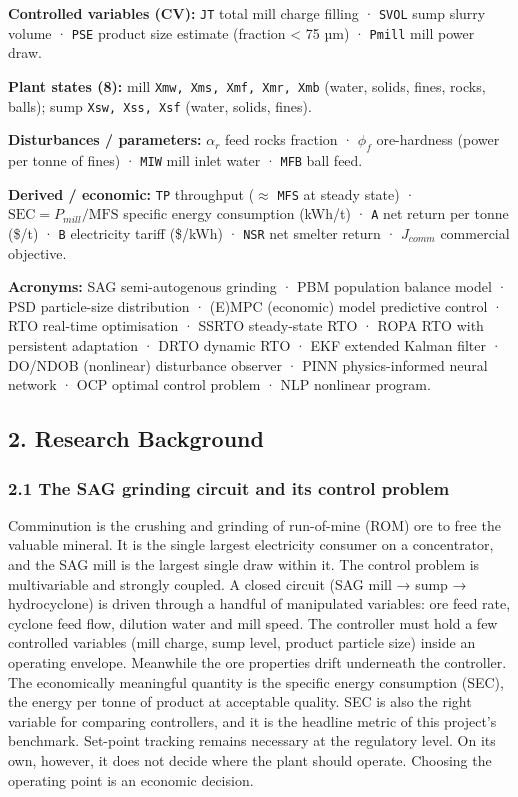 \documentclass[
  14pt,
]{extarticle}
\begin{document}
\textbf{Controlled variables (CV):} \texttt{JT} total mill charge
filling · \texttt{SVOL} sump slurry volume · \texttt{PSE} product size
estimate (fraction \textless{} 75 µm) · \texttt{Pmill} mill power draw.

\textbf{Plant states (8):} mill \texttt{Xmw,\ Xms,\ Xmf,\ Xmr,\ Xmb}
(water, solids, fines, rocks, balls); sump \texttt{Xsw,\ Xss,\ Xsf}
(water, solids, fines).

\textbf{Disturbances / parameters:} $\alpha_r$ feed rocks fraction ·
$\phi_f$ ore-hardness (power per tonne of fines) · \texttt{MIW} mill
inlet water · \texttt{MFB} ball feed.

\textbf{Derived / economic:} \texttt{TP} throughput ($\approx$ \texttt{MFS} at
steady state) · $\mathrm{SEC}=P_{mill}/\mathrm{MFS}$ specific energy consumption
(kWh/t) · \texttt{A} net return per tonne (\$/t) · \texttt{B}
electricity tariff (\$/kWh) · \texttt{NSR} net smelter return ·
$J_{comm}$ commercial objective.

\textbf{Acronyms:} SAG semi-autogenous grinding · PBM population balance
model · PSD particle-size distribution · (E)MPC (economic) model
predictive control · RTO real-time optimisation · SSRTO steady-state RTO
· ROPA RTO with persistent adaptation · DRTO dynamic RTO · EKF extended
Kalman filter · DO/NDOB (nonlinear) disturbance observer · PINN
physics-informed neural network · OCP optimal control problem · NLP
nonlinear program.

\newpage

\subsection{2. Research Background}\label{research-background}

\subsubsection{2.1 The SAG grinding circuit and its control
problem}\label{the-sag-grinding-circuit-and-its-control-problem}

Comminution is the crushing and grinding of run-of-mine (ROM) ore to
free the valuable mineral. It is the single largest electricity consumer
on a concentrator, and the SAG mill is the largest single draw within
it. The control problem is multivariable and strongly coupled. A closed
circuit (SAG mill → sump → hydrocyclone) is driven through a handful of
manipulated variables: ore feed rate, cyclone feed flow, dilution water
and mill speed. The controller must hold a few controlled variables
(mill charge, sump level, product particle size) inside an operating
envelope. Meanwhile the ore properties drift underneath the controller.
The economically meaningful quantity is the specific energy consumption
(SEC), the energy per tonne of product at acceptable quality. SEC is
also the right variable for comparing controllers, and it is the
headline metric of this project's benchmark. Set-point tracking remains
necessary at the regulatory level. On its own, however, it does not
decide where the plant should operate. Choosing the operating point is
an economic decision.
\end{document}
